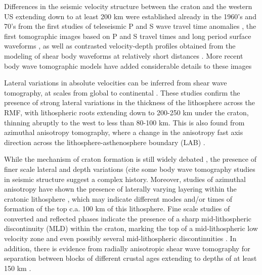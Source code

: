 \documentclass[12pt]{article}
\begin{document}
Differences in the seismic velocity structure between the craton and the western US extending down to at least 200 km were established already in the 1960's and 70's from the first studies of teleseismic P and S wave travel time anomalies  \citep[e.g.][]{cleary1966analysis,herrin1968regional,poupinet1979relation}, the first tomographic images based on P and S travel times \citep{romanowicz1979seismic} and long period surface waveforms \citep{woodhouse1984mapping}, as well as contrasted velocity-depth profiles obtained from the modeling of shear body waveforms at relatively short distances \citep[e.g.][]{grand1984upper}. More recent body wave tomographic models have added considerable details to these images \citep{sigloch2011mantle,burdick2014model,porritt2014seismic,porritt2015lithospheric}

Lateral variations in absolute velocities can be inferred from shear wave tomography, at scales from global \citep[e.g.][]{su1994degree,megnin2000three,shapiro2002monte,panning2006three,kustowski2008anisotropic,ritsema2010s40rts,lekic2011inferring,debayle2012global,schaeffer2013global} to continental \citep{lee2005surface,yuan20113,yuan2014lithospheric,schaeffer2014imaging}. These studies confirm the presence of strong lateral variations in the thickness of the lithosphere across the RMF, with lithospheric roots extending down to 200-250 km under the craton, thinning abruptly to the west to less than 80-100 km. This is also found from azimuthal anisotropy tomography, where  a change in the anisotropy fast axis direction across the lithosphere-asthenosphere boundary (LAB) \citep{marone2007depth,yuan2010lithospheric}.


While the mechanism of craton formation is still widely debated \citep[e.g.][]{s2005archean,lee2011building}, the presence of finer scale lateral and depth variations {\color{red} (cite some body wave tomography studies} in seismic structure suggest a complex history. Moreover, studies of azimuthal anisotropy have shown the presence of laterally varying layering within the cratonic lithosphere \citep[e.g.][]{levin1999shear,deschamps2008stratified,yuan2010lithospheric}, which may indicate different modes and/or times of formation of the top c.a. 100 km of this lithosphere. Fine scale studies of converted and reflected phases indicate the presence of a sharp mid-lithospheric discontinuity (MLD) within the craton, marking the top of a mid-lithospheric low velocity zone \citep{thybo1997seismic,bostock1998mantle,abt2010north,fischer2010lithosphere,rader2015characterization,ford2016midlithospheric} and even possibly several mid-lithospheric discontinuities \citep{calo2016layered}. In addition, there is evidence from radially anisotropic shear wave tomography for separation between blocks of different crustal ages extending to depths of at least 150 km \citep[e.g.][]{yuan2014lithospheric}.
\end{document}
